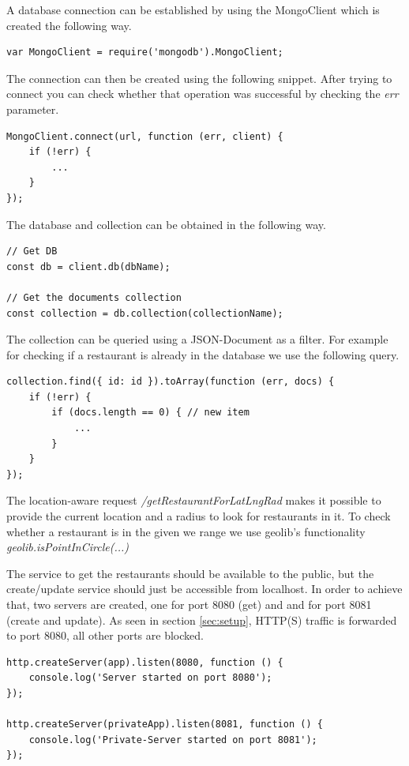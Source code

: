 A database connection can be established by using the MongoClient which is created the following way.
\begin{lstlisting}
var MongoClient = require('mongodb').MongoClient;
\end{lstlisting} 

The connection can then be created using the following snippet. After trying to connect you can check whether that operation was successful by checking the \textit{err} parameter.
\begin{lstlisting}
MongoClient.connect(url, function (err, client) {
	if (!err) {
		...
	}
});
\end{lstlisting}

The database and collection can be obtained in the following way.
\begin{lstlisting}
// Get DB
const db = client.db(dbName);

// Get the documents collection
const collection = db.collection(collectionName);
\end{lstlisting}

The collection can be queried using a JSON-Document as a filter. For example for checking if a restaurant is already in the database we use the following query.
\begin{lstlisting}
collection.find({ id: id }).toArray(function (err, docs) {
	if (!err) {
		if (docs.length == 0) { // new item
			...
		} 
	}
});
\end{lstlisting}

The location-aware request \textit{/getRestaurantForLatLngRad} makes it possible to provide the current location and a radius to look for restaurants in it. To check whether a restaurant is in the given we range we use geolib's functionality \textit{geolib.isPointInCircle(...)}

The service to get the restaurants should be available to the public, but the create/update service should just be accessible from localhost. In order to achieve that, two servers are created, one for port 8080 (get) and and for port 8081 (create and update). As seen in section \ref{sec:setup}, HTTP(S) traffic is forwarded to port 8080, all other ports are blocked.
\begin{lstlisting}
http.createServer(app).listen(8080, function () {
	console.log('Server started on port 8080');
});

http.createServer(privateApp).listen(8081, function () {
	console.log('Private-Server started on port 8081');
});
\end{lstlisting}

